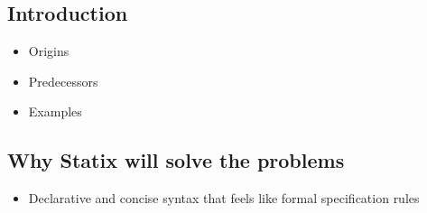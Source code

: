   \subsection{Introduction}

    \begin{itemize}
      \item Origins
      \item Predecessors
      \item Examples
    \end{itemize}

  \subsection{Why Statix will solve the problems}

    \begin{itemize}
      \item Declarative and concise syntax that feels like formal specification rules
    \end{itemize}
